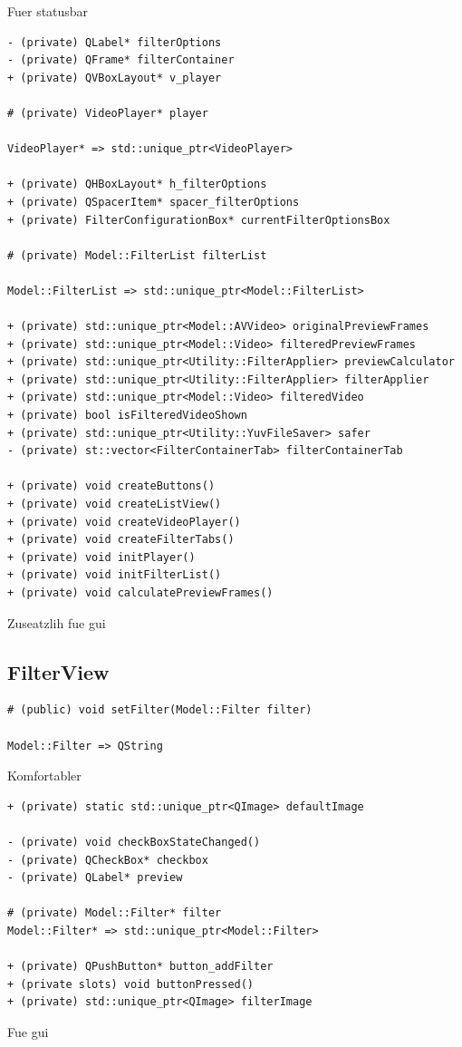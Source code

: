 \documentclass[parskip=full]{scrartcl}
\begin{document}
Fuer statusbar
\begin{verbatim}
- (private) QLabel* filterOptions
- (private) QFrame* filterContainer
+ (private) QVBoxLayout* v_player

# (private) VideoPlayer* player

VideoPlayer* => std::unique_ptr<VideoPlayer>

+ (private) QHBoxLayout* h_filterOptions
+ (private) QSpacerItem* spacer_filterOptions
+ (private) FilterConfigurationBox* currentFilterOptionsBox
	
# (private) Model::FilterList filterList
	
Model::FilterList => std::unique_ptr<Model::FilterList>
	
+ (private) std::unique_ptr<Model::AVVideo> originalPreviewFrames
+ (private) std::unique_ptr<Model::Video> filteredPreviewFrames
+ (private) std::unique_ptr<Utility::FilterApplier> previewCalculator
+ (private) std::unique_ptr<Utility::FilterApplier> filterApplier
+ (private) std::unique_ptr<Model::Video> filteredVideo
+ (private) bool isFilteredVideoShown
+ (private) std::unique_ptr<Utility::YuvFileSaver> safer
- (private) st::vector<FilterContainerTab> filterContainerTab

+ (private) void createButtons()
+ (private) void createListView()
+ (private) void createVideoPlayer()
+ (private) void createFilterTabs()
+ (private) void initPlayer()
+ (private) void initFilterList()
+ (private) void calculatePreviewFrames()
\end{verbatim}
Zuseatzlih fue gui
\subsection{FilterView}
\begin{verbatim}
# (public) void setFilter(Model::Filter filter)

Model::Filter => QString
\end{verbatim}
Komfortabler
\begin{verbatim}
+ (private) static std::unique_ptr<QImage> defaultImage

- (private) void checkBoxStateChanged()
- (private) QCheckBox* checkbox
- (private) QLabel* preview

# (private) Model::Filter* filter
Model::Filter* => std::unique_ptr<Model::Filter>

+ (private) QPushButton* button_addFilter
+ (private slots) void buttonPressed()
+ (private) std::unique_ptr<QImage> filterImage
\end{verbatim}
Fue gui
\end{document}
